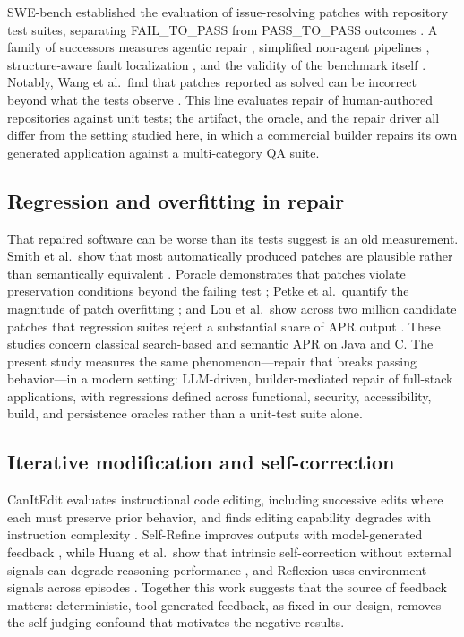 SWE-bench established the evaluation of issue-resolving patches with repository test
suites, separating FAIL\_TO\_PASS from PASS\_TO\_PASS outcomes \cite{jimenez2024swebench}.
A family of successors measures agentic repair \cite{yang2024sweagent}, simplified
non-agent pipelines \cite{xia2024agentless}, structure-aware fault localization
\cite{zhang2024autocoderover}, and the validity of the benchmark itself
\cite{aleithan2024swebenchplus}. Notably, Wang et al.\ find that patches reported as
solved can be incorrect beyond what the tests observe \cite{wang2026solved}. This
line evaluates repair of human-authored repositories against unit tests; the
artifact, the oracle, and the repair driver all differ from the setting studied here,
in which a commercial builder repairs its own generated application against a
multi-category QA suite.

\subsection{Regression and overfitting in repair}

That repaired software can be worse than its tests suggest is an old measurement.
Smith et al.\ show that most automatically produced patches are plausible rather than
semantically equivalent \cite{smith2015cure}. Poracle demonstrates that patches
violate preservation conditions beyond the failing test
\cite{ismayilzada2023poracle}; Petke et al.\ quantify the magnitude of patch
overfitting \cite{petke2024patch}; and Lou et al.\ show across two million candidate
patches that regression suites reject a substantial share of APR output
\cite{lou2024apr}. These studies concern classical search-based and semantic APR on
Java and C. The present study measures the same phenomenon---repair that breaks
passing behavior---in a modern setting: LLM-driven, builder-mediated repair of
full-stack applications, with regressions defined across functional, security,
accessibility, build, and persistence oracles rather than a unit-test suite alone.

\subsection{Iterative modification and self-correction}

CanItEdit evaluates instructional code editing, including successive edits where each
must preserve prior behavior, and finds editing capability degrades with instruction
complexity \cite{cassano2023canitedit}. Self-Refine improves outputs with
model-generated feedback \cite{madaan2023selfrefine}, while Huang et al.\ show that
intrinsic self-correction without external signals can degrade reasoning performance
\cite{huang2023selfcorrect}, and Reflexion uses environment signals across episodes
\cite{shinn2023reflexion}. Together this work suggests that the source of feedback
matters: deterministic, tool-generated feedback, as fixed in our design, removes the
self-judging confound that motivates the negative results.

